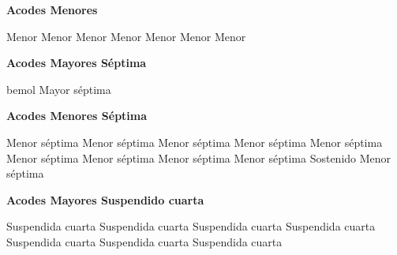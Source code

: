 \textbf{Acodes Menores}
\vskip 25pt

\small
{} Menor \qquad\qquad {} Menor \qquad\qquad {} Menor \qquad\qquad {} Menor \hfill \break
\vskip 25pt
 Menor \qquad\qquad {} Menor \qquad\qquad {} Menor
\vskip 25pt
  \qquad\qquad  {}  \qquad\qquad  {} \qquad\qquad {} \hfill \break
\vskip 25pt
 
\normalsize

\vskip 20pt
\textbf{Acodes Mayores S\'eptima}
\vskip 25pt

\small
{} \qquad\qquad {} \qquad {} \qquad\qquad
\vskip 25pt
 \qquad\qquad {} \qquad\qquad {}
\vskip 25pt
  \qquad\qquad {} bemol Mayor s\'eptima
\vskip 25pt
 \qquad\qquad
\normalsize
\vskip 20pt

\textbf{Acodes Menores S\'eptima}
\vskip 25pt

\small
{} Menor s\'eptima
 Menor s\'eptima
 Menor s\'eptima
\vskip 25pt
 Menor s\'eptima
 Menor s\'eptima
 Menor s\'eptima
\vskip 25pt
 Menor s\'eptima
 Menor s\'eptima
 Menor s\'eptima
\vskip 25pt
 Sostenido Menor s\'eptima
\normalsize

\vskip 20pt

\textbf{Acodes Mayores Suspendido cuarta}

\small
{} Suspendida cuarta
 Suspendida cuarta
 Suspendida cuarta
 Suspendida cuarta
 Suspendida cuarta
 Suspendida cuarta
 Suspendida cuarta

